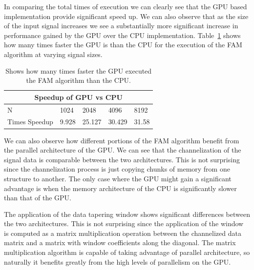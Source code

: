 In comparing the total times of execution we can clearly see that the GPU based implementation provide significant speed up.  We can also observe that as the size of the input signal increases we see a substantially more significant increase in performance gained by the GPU over the CPU implementation.  Table~\ref{tbl:fam_gpu_speedup} shows how many times faster the GPU is than the CPU for the execution of the FAM algorithm at varying signal sizes.

\begin{table}
\begin{center}
\begin{tabular}{|l|l|l|l|l|}
\hline
\multicolumn{5}{|c|}{Speedup of GPU vs CPU} \\
\hline
N & 1024 & 2048 & 4096 & 8192 \\
\hline
Times Speedup & 9.928 & 25.127 & 30.429 & 31.58 \\
\hline
\end{tabular}
\vspace{0.5cm}
\caption{Shows how many times faster the GPU executed the FAM algorithm than the CPU.}
\label{tbl:fam_gpu_speedup}
\end{center}
\end{table}

We can also observe how different portions of the FAM algorithm benefit from the parallel architecture of the GPU.  We can see that the channelization of the signal data is comparable between the two architectures.  This is not surprising since the channelization process is just copying chunks of memory from one structure to another.  The only case where the GPU might gain a significant advantage is when the memory architecture of the CPU is significantly slower than that of the GPU.

The application of the data tapering window shows significant differences between the two architectures.  This is not surprising since the application of the window is computed as a matrix multiplication operation between the channelized data matrix and a matrix with window coefficients along the diagonal.  The matrix multiplication algorithm is capable of taking advantage of parallel architecture, so naturally it benefits greatly from the high levels of parallelism on the GPU.

